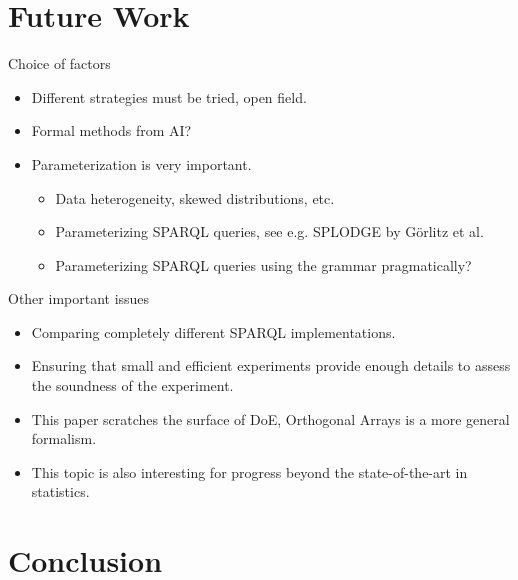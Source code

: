 \documentclass[english,usenames,dvipsnames,aspectratio=169]{beamer}
\begin{document}
\section{Future Work}

\begin{frame}{Choice of factors}

  \begin{itemize}
  \item Different strategies must be tried, open field.
  \item Formal methods from AI?
  \item Parameterization is very important.
    \begin{itemize}
    \item Data heterogeneity, skewed distributions, etc.
    \item Parameterizing SPARQL queries, see e.g. SPLODGE by Görlitz
      et al.
    \item Parameterizing SPARQL queries using the grammar pragmatically?
    \end{itemize}
  \end{itemize}
  
\end{frame}

\begin{frame}{Other important issues}

  \begin{itemize}
  \item Comparing completely different SPARQL implementations.
  \item Ensuring that small and efficient experiments provide enough
    details to assess the soundness of the experiment.
  \item This paper scratches the surface of DoE, Orthogonal Arrays is
    a more general formalism.
  \item This topic is also interesting for progress beyond the
    state-of-the-art in statistics.
  \end{itemize}
  
\end{frame}

\section{Conclusion}
\end{document}
